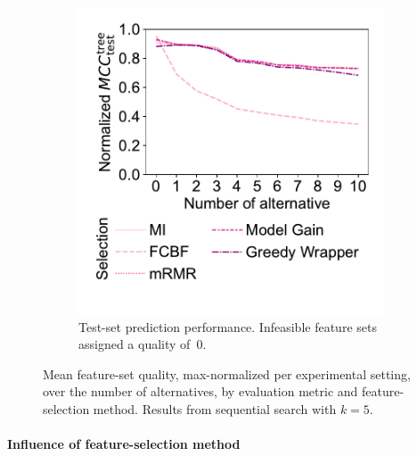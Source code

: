 \documentclass{article}
\theoremstyle{definition}
\begin{document}
\begin{figure}[htbp]
\begin{subfigure}[t]{0.48\textwidth}
		\includegraphics[width=\textwidth, trim=20 40 15 15, clip]{plots/afs-impact-num-alternatives-fs-method-decision-tree-test-mcc-max-fillna.pdf}
		\caption{
			Test-set prediction performance.
			Infeasible feature sets assigned a quality of~0.
		}
		\label{fig:afs:impact-num-alternatives-fs-method-decision-tree-test-mcc-max-fillna}
	\end{subfigure}
	\caption{
		Mean feature-set quality, max-normalized per experimental setting, over the number of alternatives, by evaluation metric and feature-selection method.
		Results from sequential search with $k=5$.
	}
	\label{fig:afs:impact-num-alternatives-fs-method-quality}
\end{figure}

\paragraph{Influence of feature-selection method}
\end{document}

